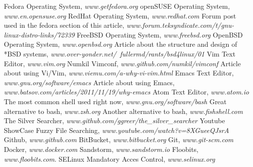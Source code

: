 \documentclass[paper=a4, fontsize=10pt]{scrartcl} %
\numberwithin{equation}{section} %
\numberwithin{figure}{section} %
\numberwithin{table}{section} %
\begin{document}
\newpage %
\begin{thebibliography}{99} %
    Fedora Operating System,
    \emph{www.getfedora.org}
    openSUSE Operating System,
    \emph{www.en.opensuse.org}
    RedHat Operating System,
    \emph{www.redhat.com}
    Forum post used in the fedora section of this article,\newline
    \emph{www.forum.teksyndicate.com/t/gnu-linux-distro-links/72339}
    FreeBSD Operating System,
    \emph{www.freebsd.org}
    OpenBSD Operating System,
    \emph{www.openbsd.org}
    Article about the structure and design of *BSD systems,\newline
    \emph{www.over-yonder.net/~fullermd/rants/bsd4linux/01}
    Vim Text Editor,
    \emph{www.vim.org}
    Numkil Vimconf,
    \emph{www.github.com/numkil/vimconf}
    Article about using Vi/Vim,
    \emph{www.viemu.com/a-why-vi-vim.html}
    Emacs Text Editor,
    \emph{www.gnu.org/software/emacs}
    Article about using Emacs,
    \emph{www.batsov.com/articles/2011/11/19/why-emacs}
    Atom Text Editor,
    \emph{www.atom.io}
    The most common shell used right now,
    \emph{www.gnu.org/software/bash}
    Great alternative to bash,
    \emph{www.zsh.org}
    Another alternative to bash,
    \emph{www.fishshell.com}
    The Silver Searcher,
    \emph{www.github.com/ggreer/the\_silver\_searcher}
    Youtube ShowCase Fuzzy File Searching,\newline
    \emph{www.youtube.com/watch?v=8XGueeQJsrA}
    Github,
    \emph{www.github.com}
    BitBucket,
    \emph{www.bitbucket.org}
    Git,
    \emph{www.git-scm.com}
    Docker,
    \emph{www.docker.com}
    Sandstorm,
    \emph{www.sandstorm.io}
    Floobits,
    \emph{www.floobits.com}.
    SELinux Mandatory Acces Control,
    \emph{www.selinux.org}
\end{thebibliography}

\end{document}
